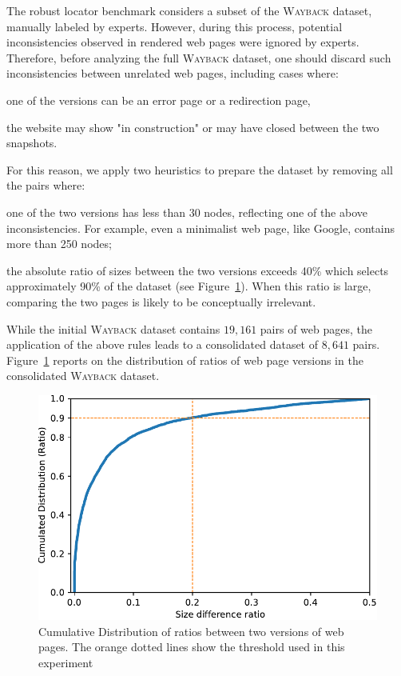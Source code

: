 \vspace{6pt}
The robust locator benchmark considers a subset of the \textsc{Wayback} dataset, manually labeled by experts.
However, during this process, potential inconsistencies observed in rendered web pages were ignored by experts.
% 
Therefore, before analyzing the full \textsc{Wayback} dataset, one should discard such inconsistencies between unrelated web pages, including cases where:
\begin{inparaenum}[\em (a)]
\item one of the versions can be an error page or a redirection page,
\item the website may show "in construction" or may have closed between the two snapshots.
\end{inparaenum}  
% 
For this reason, we apply two heuristics to prepare the dataset by removing all the pairs where:
\begin{compactenum}
  \item one of the two versions has less than 30 nodes, reflecting one of the above inconsistencies.
  For example, even a minimalist web page, like Google, contains more than 250 nodes;
  \item the absolute ratio of sizes between the two versions exceeds 40\% which
  selects approximately 90\% of the dataset (see
  Figure~\ref{fig:sizeDiffRatioDistribution}). When this ratio is large,
  comparing the two pages is likely to be conceptually irrelevant.
\end{compactenum}

While the initial \textsc{Wayback} dataset contains $19,161$ pairs of web pages, the application of the above rules leads to a consolidated dataset of $8,641$ pairs. %
Figure~\ref{fig:sizeDiffRatioDistribution} reports on the distribution of ratios of web page versions in the consolidated \textsc{Wayback} dataset.

\begin{figure}
  \centering
  \includegraphics[width=.8\linewidth]{erratum/sizeDiffRatioDistribution}
  \caption{Cumulative Distribution of ratios between two versions of web pages.
    The orange dotted lines show the threshold used in this experiment}
  \label{fig:sizeDiffRatioDistribution}
\end{figure}


